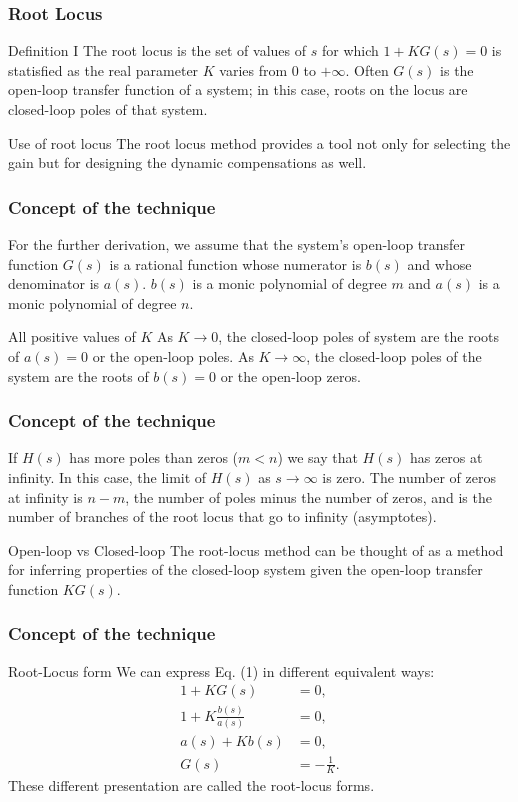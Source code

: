 \begin{frame}
\frametitle{Root Locus}
	\begin{block}{Definition I}
		The root locus is the set of values of $s$ for which $1 + KG(s) = 0$ is statisfied as the real parameter $K$ varies from $0$ to $+\infty$. Often $G(s)$ is the open-loop transfer function of a system; in this case, roots on the locus are closed-loop poles of that system.
	\end{block}
	\begin{block}{Use of root locus}
		The root locus method provides a tool not only for selecting the gain but for designing the dynamic compensations as well.
	\end{block}
	
\end{frame}

\begin{frame}
\frametitle{Concept of the technique}
	For the further derivation, we assume that the system's open-loop transfer function $G(s)$ is a rational function whose numerator is $b(s)$ and whose denominator is $a(s)$. $b(s)$ is a monic polynomial of degree $m$ and $a(s)$ is a monic polynomial of degree $n$. 
	\vspace{1em}
	\begin{block}{All positive values of $K$}
		As $K \rightarrow 0$, the closed-loop poles of system are the roots of $a(s) = 0$ or the open-loop poles. As $K \rightarrow \infty$, the closed-loop poles of the system are the roots of $b(s) = 0$ or the open-loop zeros.
	\end{block}
\end{frame}

\begin{frame}
\frametitle{Concept of the technique}
	If $H(s)$ has more poles than zeros ($m < n$) we say that $H(s)$ has zeros at infinity. In this case, the limit of $H(s)$ as $s \rightarrow \infty$ is zero. The number of zeros at infinity is $n-m$, the number of poles minus the number of zeros, and is the number of branches of the root locus that go to infinity (asymptotes).
	
	\begin{alertblock}{Open-loop vs Closed-loop}
		The root-locus method can be thought of as a method for inferring properties of the closed-loop system given the open-loop transfer function $KG(s)$.
	\end{alertblock}
\end{frame}

\begin{frame}
\frametitle{Concept of the technique}
\begin{block}{Root-Locus form}
	We can express Eq. (1) in different equivalent ways:
	\vspace{-1em}
	\begin{align*}
		1 + KG(s) &= 0,\\
		1 + K\frac{b(s)}{a(s)} &= 0,\\
		a(s) + Kb(s) &=0,\\
		G(s) & = -\frac{1}{K}.
	\end{align*}
	These different presentation are called the root-locus forms.
\end{block}
\end{frame}

